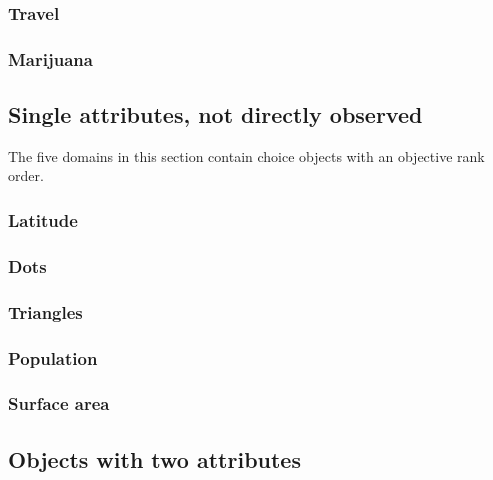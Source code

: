 \documentclass[11pt,letter]{article}
\begin{document}


\subsubsection{Travel}



\subsubsection{Marijuana}



\subsection{Single attributes, not directly observed}

The five domains in this section contain choice objects with an objective rank order.

\subsubsection{Latitude}



\subsubsection{Dots}



\subsubsection{Triangles}



\subsubsection{Population}



\subsubsection{Surface area}



\subsection{Objects with two attributes}
\end{document}
